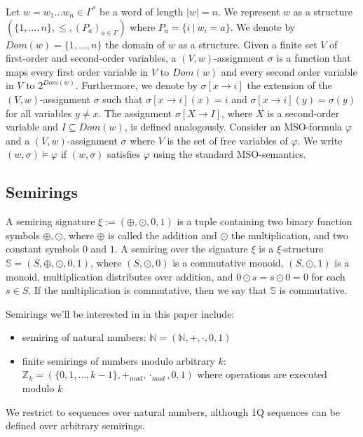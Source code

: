 \documentclass[12pt]{article}
\theoremstyle{definition}
\begin{document}
Let $w = w_1\ldots w_n \in \Gamma^*$ be a word of length $|w| = n$. We represent $w$ as a structure $(\{1,\ldots,n\}, \leq, (P_a)_{a \in \Gamma})$ where $P_a = \{i \ | \ w_i = a\}$. We denote by $Dom(w) = \{1,\ldots,n\}$ the domain of $w$ as a structure. Given a finite set $V$ of first-order and second-order variables, a $(V,w)$-assignment $\sigma$ is a function that maps every first order variable in $V$ to $Dom(w)$ and every second order variable in $V$ to $2^{Dom(w)}$. Furthermore, we denote by $\sigma[x \rightarrow i]$ the extension of the $(V,w)$-assignment $\sigma$ such that $\sigma[x \rightarrow i](x) = i$ and $\sigma[x \rightarrow i](y) = \sigma(y)$ for all variables $y \ne x$. The assignment $\sigma[X \rightarrow I]$, where $X$ is a second-order variable and $I \subseteq Dom(w)$, is defined analogously. Consider an MSO-formula $\varphi$ and a $(V,w)$-assignment $\sigma$ where $V$ is the set of free variables of $\varphi$. We write $(w, \sigma) \models \varphi$ if $(w, \sigma)$ satisfies $\varphi$ using the standard MSO-semantics.

\subsection{Semirings}

A semiring signature $\xi := (\oplus, \odot, 0, 1)$ is a tuple containing two binary function symbols $\oplus, \odot$, where $\oplus$ is called the addition and $\odot$ the multiplication, and two constant symbols $0$ and $1$. A semiring over the signature $\xi$ is a $\xi$-structure $\mathbb{S} = (S, \oplus, \odot, 0, 1)$, where $(S, \odot, 0)$ is a commutative monoid, $(S, \odot, 1)$ is a monoid, multiplication distributes over addition, and $0 \odot s = s \odot 0 = 0$ for each $s \in S$. If the multiplication is commutative, then we say that $\mathbb{S}$ is commutative.

Semirings we'll be interested in in this paper include:

\begin{itemize}
    \item semiring of natural numbers: $\mathbb{N} = (\mathbb{N}, +, \cdot, 0, 1)$
    \item finite semirings of numbers modulo arbitrary $k$: $ \mathbb{Z}_k = (\{0,1,\ldots,k-1\}, +_{mod}, \cdot_{mod}, 0, 1)$ where operations are executed modulo $k$
\end{itemize}

We restrict to sequences over natural numbers, although 1Q sequences can be defined over arbitrary semirings.
\end{document}
